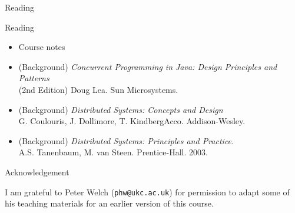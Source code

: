 \documentclass{concdistfoils}
\def\heading#1{\begin{cframed}[8.8in]{#1}\end{cframed}}
\begin{document}
\begin{section}{Reading}
\begin{slide}
\heading {Reading}

\begin{itemize}
\item Course notes

\item  (Background) \textsl{Concurrent Programming in Java: Design Principles and Patterns}
        \\(2nd Edition) Doug Lea. Sun Microsystems. \label{LEA}


\item (Background) \textsl{Distributed Systems: Concepts and Design}
           \\G. Coulouris, J. Dollimore, T. KindbergAcco. \label{COU}
                Addison-Wesley.

\item   (Background) \textsl{Distributed Systems: Principles and Practice.}
        \\A.S. Tanenbaum, M. van Steen. Prentice-Hall. 2003. \label{TAN}

\end{itemize}

\vfill

\heading{Acknowledgement}

I am grateful to Peter Welch (\texttt{phw@ukc.ac.uk}) for permission to
adapt some of his teaching materials for an earlier version of this
course. 

\end{slide}
\end{section}
\end{document}
